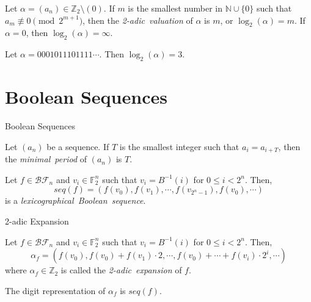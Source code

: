 \documentclass{beamer}
\def\zzz{\mathbb{Z}}
\def\gftwo{\mathbb{F}_2}
\def\nnn{\mathbb{N}}
\def\BF{\mathcal{BF}}
\def\an{(a_n)}
\begin{document}
\begin{frame}
  \begin{definition}
    Let $\alpha=\an\in\zzz_2\setminus(0)$. If $m$ is the smallest number in
    $\nnn\cup\{0\}$ such that $a_m \not\equiv 0 \pmod 2^{m+1}$, then the {\em
    2-adic\ valuation} of $\alpha$ is $m$, or $\log_2(\alpha)=m$. If $\alpha=0$,
    then $\log_2(\alpha)=\infty$.
  \end{definition}
  \begin{example}
    Let $\alpha=0001011101111\cdots$. Then $\log_2(\alpha)=3$.
  \end{example}
\end{frame}

\section{Boolean Sequences}
\begin{frame}{Boolean Sequences}
  \begin{definition}
    Let $(a_n)$ be a sequence. If $T$ is the smallest integer such that
    $a_i=a_{i+T}$, then the {\em minimal\ period} of $(a_n)$ is $T$.
  \end{definition}
  
  \begin{definition}\label{def:lex-Bool-seq}
    Let $f\in\BF_n$ and $v_i\in\gftwo^n$ such that $v_i=B^{-1}(i)$ for
    $0\leq i<2^n$. Then,
    \begin{equation}
      seq(f)=(f(v_0),f(v_1),\cdots,f(v_{2^n-1}),f(v_0),\cdots)
    \end{equation}
    is a {\em lexicographical\ Boolean\ sequence}.
  \end{definition}
\end{frame}

\begin{frame}{2-adic Expansion}
  \begin{definition}\label{2-adic-ex}
    Let $f\in\BF_n$ and $v_i\in\gftwo^n$ such that $v_i=B^{-1}(i)$ for
    $0\leq i<2^n$. Then,
    \begin{equation}
      \alpha_f=(f(v_0),f(v_0)+f(v_1)\cdot2,\cdots,\allowbreak
        f(v_0)+\cdots\allowbreak+f(v_i)\cdot2^i,\allowbreak\cdots)
    \end{equation}
    where $\alpha_f\in\zzz_2$ is called the {\em 2-adic\ expansion} of $f$.
  \end{definition}
  
  \begin{lemma}
    The digit representation of $\alpha_f$ is $seq(f)$.
  \end{lemma}
\end{frame}
\end{document}
